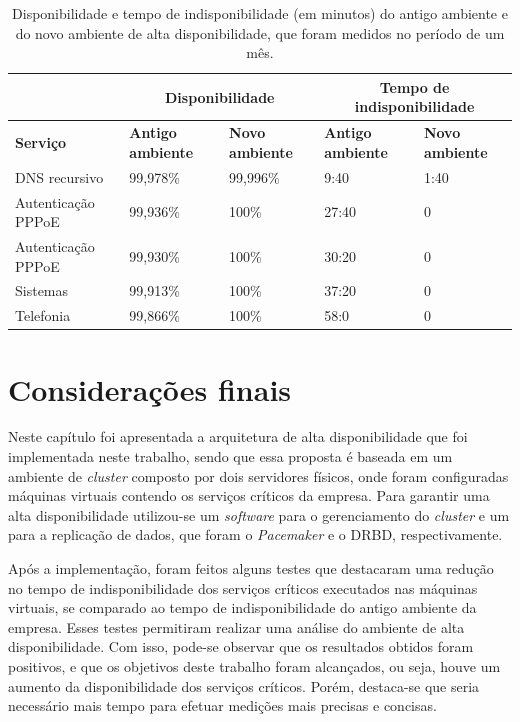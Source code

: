 \begin{table}[h!]
\caption{Disponibilidade e tempo de indisponibilidade (em minutos) do antigo ambiente e do novo ambiente de alta disponibilidade, que foram medidos no período de um mês.}
\small
\label{tab:testefinal}
\begin{center}
\begin{tabular}{|l|p{2cm}|p{2cm}|p{2cm}|p{2cm}|}\hline
 & \multicolumn{2}{|c|}{\textbf{Disponibilidade}} & \multicolumn{2}{|c|}{\textbf{Tempo de indisponibilidade}} \\\hline
\textbf{Serviço} & \textbf{Antigo ambiente} & \textbf{Novo ambiente} & \textbf{Antigo ambiente} & \textbf{Novo ambiente} \\\hline
DNS recursivo & 99,978\% & 99,996\% & 9:40 & 1:40 \\\hline
Autenticação \ac{PPPoE} & 99,936\% & 100\% & 27:40 & 0 \\\hline
Autenticação \ac{PPPoE} & 99,930\% & 100\% & 30:20 & 0 \\\hline
Sistemas & 99,913\% & 100\% & 37:20 & 0 \\\hline
Telefonia & 99,866\% & 100\% & 58:0 & 0 \\\hline
\end{tabular}
\end{center}
\end{table}


\section{Considerações finais}

Neste capítulo foi apresentada a arquitetura de alta disponibilidade que foi implementada neste trabalho, sendo que essa proposta é baseada em
um ambiente de \textit{cluster} composto por dois servidores físicos, onde foram configuradas máquinas virtuais contendo os serviços 
críticos da empresa. Para garantir uma alta disponibilidade utilizou-se um \textit{software} para o gerenciamento do \textit{cluster} e um 
para a replicação de dados, que foram o \textit{Pacemaker} e o \ac{DRBD}, respectivamente.

Após a implementação, foram feitos alguns testes que destacaram uma redução no tempo de indisponibilidade dos serviços 
críticos executados nas máquinas virtuais, se comparado ao tempo de indisponibilidade do antigo ambiente da empresa. 
Esses testes permitiram realizar uma análise do ambiente de alta disponibilidade.
Com isso, pode-se observar que os resultados obtidos foram positivos, e que os objetivos deste trabalho foram alcançados, ou seja, houve um 
aumento da disponibilidade dos serviços críticos. Porém, destaca-se que seria necessário mais tempo para efetuar medições mais precisas e concisas.

